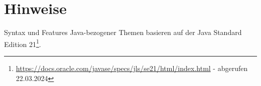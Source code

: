 \section*{Hinweise}

Syntax und Features Java-bezogener Themen basieren auf der Java Standard Edition 21\footnote{
\url{https://docs.oracle.com/javase/specs/jls/se21/html/index.html} - abgerufen 22.03.2024
}.
